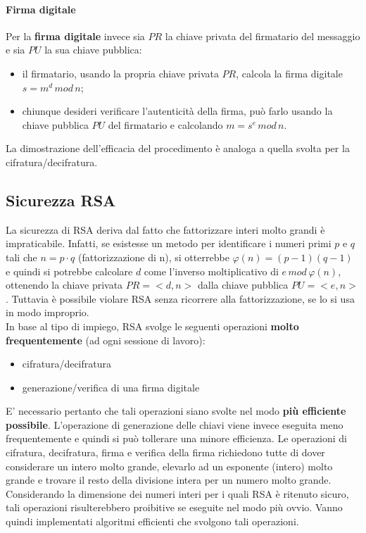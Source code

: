 \paragraph{Firma digitale}
Per la \textbf{firma digitale} invece sia $PR$ la chiave privata del firmatario del messaggio e sia $PU$ la sua chiave pubblica: 
\begin{itemize}
\item il firmatario, usando la propria chiave privata $PR$, calcola la firma digitale $s = m^d \, mod \, n$;
\item chiunque desideri verificare l'autenticità della firma, può farlo usando la chiave pubblica $PU$ del firmatario e calcolando $m = s^e \, mod \, n$.
\end{itemize}
La dimostrazione dell'efficacia del procedimento è analoga a quella svolta per la cifratura/decifratura.

\subsection{Sicurezza RSA}

La sicurezza di RSA deriva dal fatto che fattorizzare interi molto grandi è impraticabile. Infatti, se esistesse un metodo per identificare i numeri primi $p$ e $q$ tali che $n = p \cdot q$ (fattorizzazione di n), si otterrebbe $\varphi(n) = (p-1)(q-1)$ e quindi si potrebbe calcolare $d$ come l'inverso moltiplicativo di $e \, mod \, \varphi(n)$, ottenendo la chiave privata $PR = <d,n>$ dalla chiave pubblica $PU = <e,n>$. 
\newline \newline
Tuttavia è possibile violare RSA senza ricorrere alla fattorizzazione, se lo si usa in modo improprio. \\
In base al tipo di impiego, RSA svolge le seguenti operazioni\textbf{ molto frequentemente} (ad ogni sessione di lavoro): 
\begin{itemize}
\item cifratura/decifratura
\item generazione/verifica di una firma digitale
\end{itemize}
E' necessario pertanto che tali operazioni siano svolte nel modo \textbf{più efficiente possibile}. L'operazione di generazione delle chiavi viene invece eseguita meno frequentemente e quindi si può tollerare una minore efficienza.
\newline \newline
Le operazioni di cifratura, decifratura, firma e verifica della firma richiedono tutte di dover considerare un intero molto grande, elevarlo ad un esponente (intero) molto grande e trovare il resto della divisione intera per un numero molto grande. Considerando la dimensione dei numeri interi per i quali RSA è ritenuto sicuro, tali operazioni risulterebbero proibitive se eseguite nel modo più ovvio. Vanno quindi implementati algoritmi efficienti che svolgono tali operazioni.

